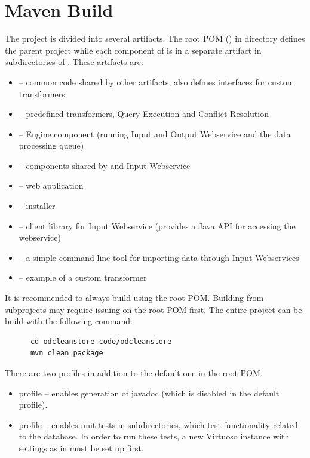 \section{Maven Build}
\label{sec:mavenBuild}
The project is divided into several artifacts. The root POM () in  directory defines the parent project while each component of \odcs is in a separate artifact in subdirectories of . These artifacts are:

\begin{itemize}
	\item {} -- common code shared by other artifacts; also defines interfaces for custom transformers
	\item {} -- predefined transformers, Query Execution and Conflict Resolution
	\item {} -- Engine component (running Input and Output Webservice and the data processing queue)
	\item {} -- components shared by  and Input Webservice
	\item {} -- \FE web application
	\item {} -- \odcs installer
	\item {} -- client library for Input Webservice (provides a Java API for accessing the webservice)
	\item {} -- a simple command-line tool for importing data through Input Webservices
	\item {} -- example of a custom transformer
\end{itemize}


It is recommended to always build using the root POM. Building from subprojects may require issuing  on the root POM first. The entire project can be build with the following command:

\begin{verbatim}
      cd odcleanstore-code/odcleanstore
      mvn clean package
\end{verbatim}

There are two profiles in addition to the default one in the root POM.

\begin{itemize}
	\item {} profile -- enables generation of javadoc (which is disabled in the default profile). 
	\item {} profile -- enables unit tests in  subdirectories, which test functionality related to the database. In order to run these tests, a new Virtuoso instance with settings as in  must be set up first.
\end{itemize}

